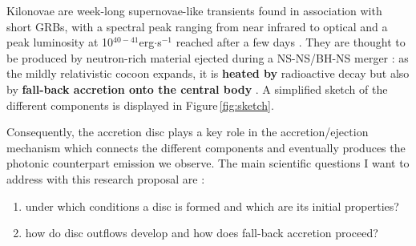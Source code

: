 \documentclass[11pt,onecolumn]{article}
\makeatletter
\newcommand{\grb}{GRB\xspace}
\newcommand{\grbs}{GRBs\xspace}
\newcommand*{\ns}{NS\@\xspace}
\newcommand*{\bh}{BH\@\xspace}
\newcommand*{\bhs}{BHs\@\xspace}
\makeatother
\begin{document}
Kilonovae are week-long supernovae-like transients found in association with short \grbs, with a spectral peak ranging from near infrared to optical and a peak luminosity at 10$^{40-41}$erg$\cdot$s$^{-1}$ reached after a few days \citep{Tanaka2016,Metzger2017}. They are thought to be produced by neutron-rich material ejected during a \ns-\ns/\bh-\ns merger : as the mildly relativistic cocoon expands, it is \textbf{heated by} radioactive decay \citep{Li1998} but also by \textbf{fall-back accretion onto the central body} \citep{Rosswog2007}. A simplified sketch of the different components is displayed in Figure\,\ref{fig:sketch}. 

Consequently, the accretion disc plays a key role in the accretion/ejection mechanism which connects the different components and eventually produces the photonic counterpart emission we observe. The main scientific questions I want to address with this research proposal are :
\begin{enumerate}[itemsep=0mm]
\item under which conditions a disc is formed and which are its initial properties?
\item how do disc outflows develop and how does fall-back accretion proceed?
\end{enumerate}

%
%
\end{document}
